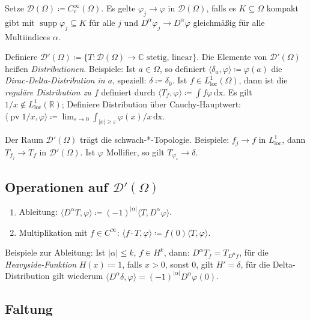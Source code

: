 \documentclass[11pt,a4paper]{scrartcl}
\newcommand{\R}{\mathbb{R}} %
\newcommand{\C}{\mathbb{C}} %
\newcommand{\D}{\mathcal{D}}
\theoremstyle{plain}
\theoremstyle{definition}
\theoremstyle{remark}
\DeclareMathOperator{\supp}{supp}
\DeclareMathOperator{\loc}{loc}
\DeclareMathOperator{\pv}{pv}
\begin{document}
Setze $\D(\Omega)\coloneqq C_c^\infty(\Omega)$. Es gelte $\varphi_j \to \varphi$ in $\D(\Omega)$, falls es $K\subseteq \Omega$ kompakt gibt mit $\supp \varphi_j \subseteq K$ für alle $j$ und $D^\alpha \varphi_j \to D^\alpha \varphi$ gleichmäßig für alle Multiindices $\alpha$.

Definiere $\D'(\Omega)\coloneqq \{ T: \D(\Omega) \to \C \text{ stetig, linear} \}$. Die Elemente von $\D'(\Omega)$ heißen \emph{Distributionen}. Beispiele: Ist $a\in \Omega$, so definiert $\langle \delta_a, \varphi \rangle \coloneqq \varphi(a)$ die \emph{Dirac-Delta-Distribution in $a$}, speziell: $\delta \coloneqq \delta_0$. Ist $f\in L^1_{\loc}(\Omega)$, dann ist die \emph{reguläre Distribution zu $f$} definiert durch $\langle T_f, \varphi \rangle \coloneqq \int f\varphi \, \mathrm{dx}$. Es gilt $1/x\not\in L^1_{\loc}(\R)$; Definiere Distribution über Cauchy-Hauptwert: $\langle \pv 1/x, \varphi \rangle \coloneqq \lim_{\varepsilon \to 0} \int_{|x|\geq \varepsilon} \varphi(x)/x \, \mathrm{dx}$.

Der Raum $\D'(\Omega)$ trägt die schwach-*-Topologie. Beispiele: $f_j\to f$ in $L^1_{\loc}$, dann $T_{f_j}\to T_f$ in $\D'(\Omega)$. Ist $\varphi$ Mollifier, so gilt $T_{\varphi_\varepsilon}\to \delta$.

\subsection{Operationen auf $\D'(\Omega)$}

\begin{enumerate}
    \item Ableitung: $\langle D^\alpha T, \varphi \rangle \coloneqq (-1)^{|\alpha|} \langle T, D^\alpha \varphi \rangle$.
    \item Multiplikation mit $f\in C^\infty$: $\langle f\cdot T, \varphi \rangle \coloneqq f(0) \langle T, \varphi \rangle$.
\end{enumerate}

Beispiele zur Ableitung: Ist $|\alpha| \leq k$, $f\in H^k$, dann: $D^\alpha T_f = T_{D^\alpha f}$, für die \emph{Heavyside-Funktion} $H(x)\coloneqq 1$, falls $x>0$, sonst $0$, gilt $H'=\delta$, für die Delta-Distribution gilt wiederum $\langle D^\alpha \delta, \varphi \rangle = (-1)^{|\alpha|} D^\alpha \varphi(0)$.

\subsection{Faltung}
\end{document}
